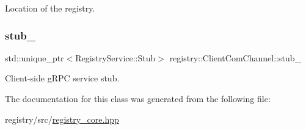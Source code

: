 Location of the registry. 

\mbox{\label{classregistry_1_1ClientComChannel_a92638fd8f461be8b5ef5a3a6c3a429ac}} 
\subsubsection{\texorpdfstring{stub\+\_\+}{stub\_}}
{\footnotesize\ttfamily std\+::unique\+\_\+ptr$<$Registry\+Service\+::\+Stub$>$ registry\+::\+Client\+Com\+Channel\+::stub\+\_\+\hspace{0.3cm}{\ttfamily [private]}}



Client-\/side g\+R\+PC service stub. 



The documentation for this class was generated from the following file\+:\begin{DoxyCompactItemize}
\item 
registry/src/\hyperlink{registry__core_8hpp}{registry\+\_\+core.\+hpp}\end{DoxyCompactItemize}
